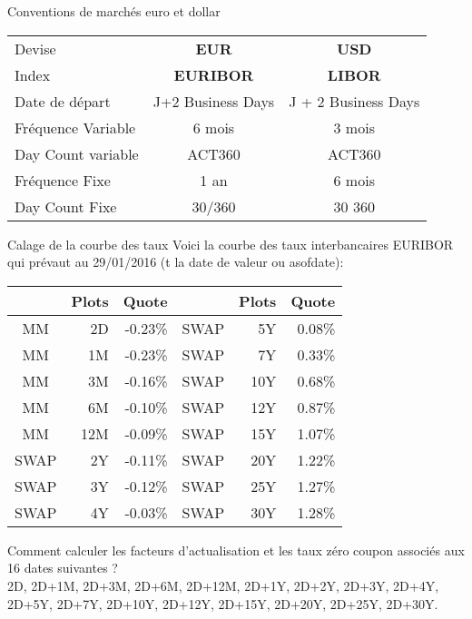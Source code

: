 \documentclass{beamer}
\begin{document}
\begin{frame}{Conventions de marchés euro et dollar}
\begin{center}
\begin{tabular}{|l|c|c|}
\hline
Devise&\textbf{EUR}&\textbf{USD}\\
Index&\textbf{EURIBOR}&\textbf{LIBOR} \\
\hline
Date de départ& J+2 Business Days&J + 2 Business Days \\
Fréquence Variable&6 mois&3 mois\\
Day Count variable&ACT360&ACT360\\
Fréquence Fixe&1 an&6 mois\\
Day Count Fixe&30/360&30 360\\
\hline
\end{tabular}
\end{center}
\end{frame}

\begin{frame}{Calage de la courbe des taux}
Voici la courbe des taux interbancaires EURIBOR qui prévaut au 29/01/2016 (t la date de valeur ou asofdate):

\begin{center}
\begin{tabular}{|c|r|r|c|r|r|}
  \hline
  & Plots & Quote & & Plots & Quote \\
  \hline
  MM & 2D & -0.23\% & SWAP & 5Y & 0.08\%\\
  MM & 1M & -0.23\% & SWAP & 7Y & 0.33\%\\
  MM & 3M & -0.16\% & SWAP & 10Y & 0.68\%\\
  MM & 6M & -0.10\% & SWAP & 12Y & 0.87\%\\
  MM & 12M & -0.09\% & SWAP & 15Y & 1.07\%\\
  SWAP & 2Y & -0.11\% & SWAP & 20Y & 1.22\%\\
  SWAP & 3Y & -0.12\% & SWAP & 25Y & 1.27\%\\
  SWAP & 4Y & -0.03\% & SWAP & 30Y & 1.28\%\\
  \hline
\end{tabular}
\end{center}
Comment calculer les facteurs d'actualisation et les taux zéro coupon associés aux 16 dates suivantes ? \\
2D, 2D+1M, 2D+3M, 2D+6M, 2D+12M, 2D+1Y, 2D+2Y, 2D+3Y, 2D+4Y, 2D+5Y, 2D+7Y, 2D+10Y, 2D+12Y, 2D+15Y, 2D+20Y, 2D+25Y, 2D+30Y.
\end{frame}
\end{document}
